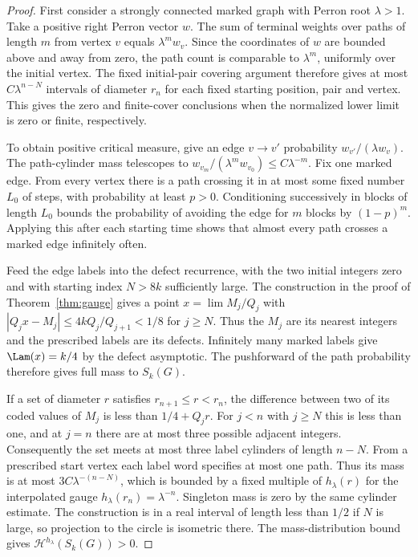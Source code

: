 \begin{proof}
First consider a strongly connected marked graph with Perron root
$\lambda>1$. Take a positive right Perron vector $w$. The sum of
terminal weights over paths of length $m$ from vertex $v$ equals
$\lambda^m w_v$. Since the coordinates of $w$ are bounded above and
away from zero, the path count is comparable to $\lambda^m$, uniformly
over the initial vertex. The fixed initial-pair covering argument
therefore gives at most $C\lambda^{n-N}$ intervals of diameter $r_n$
for each fixed starting position, pair and vertex. This gives the
zero and finite-cover conclusions when the normalized lower limit is
zero or finite, respectively.

To obtain positive critical measure, give an edge $v\to v'$ probability
$w_{v'}/(\lambda w_v)$. The path-cylinder mass telescopes to
$w_{v_m}/(\lambda^m w_{v_0})\le C\lambda^{-m}$. Fix one marked edge.
From every vertex there is a path crossing it in at most some fixed
number $L_0$ of steps, with probability at least $p>0$. Conditioning
successively in blocks of length $L_0$ bounds the probability of
avoiding the edge for $m$ blocks by $(1-p)^m$. Applying this after each
starting time shows that almost every path crosses a marked edge
infinitely often.

Feed the edge labels into the defect recurrence, with the two
initial integers zero and with starting index $N>8k$ sufficiently
large. The construction in the proof of Theorem~\ref{thm:gauge} gives
a point $x=\lim M_j/Q_j$ with
$|Q_jx-M_j|\le 4kQ_j/Q_{j+1}<1/8$ for $j\ge N$.
Thus the $M_j$ are its nearest integers and the prescribed labels
are its defects. Infinitely many marked labels give $\Lam(x)=k/4$
by the defect asymptotic. The pushforward of the path probability
therefore gives full mass to $S_k(G)$.

If a set of diameter $r$ satisfies $r_{n+1}\le r<r_n$, the difference
between two of its coded values of $M_j$ is less than
$1/4+Q_jr$. For $j<n$ with $j\ge N$ this is less than one, and
at $j=n$ there are at most three possible adjacent integers.
Consequently the set meets at most three label cylinders of length
$n-N$. From a prescribed start vertex each label word specifies at
most one path. Thus its mass is at most $3C\lambda^{-(n-N)}$, which is
bounded by a fixed multiple of $h_\lambda(r)$ for the interpolated gauge
$h_\lambda(r_n)=\lambda^{-n}$. Singleton mass is zero by the same
cylinder estimate. The construction is in a real interval of length
less than $1/2$ if $N$ is large, so projection to the circle is
isometric there. The mass-distribution bound gives
$\mathcal H^{h_\lambda}(S_k(G))>0$.


\end{proof}
